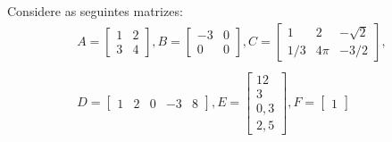 \documentclass{beamer}
\begin{document}
    \begin{frame}
      \begin{exemplos}
        Considere as seguintes matrizes:
        \begin{eqnarray*}
          A = \begin{bmatrix}
            1 & 2\\
            3 & 4
          \end{bmatrix},
          B = \begin{bmatrix}
            -3 & 0\\
            0 & 0
          \end{bmatrix},
          C = \begin{bmatrix}
            1 & 2 & -\sqrt{2}\\
            1/3 & 4\pi & -3/2
          \end{bmatrix},\\\\
          D = \begin{bmatrix}
            1 & 2 & 0 & -3 & 8
          \end{bmatrix},
          E = \begin{bmatrix}
            12\\
            3\\
            0,3\\
            2,5
          \end{bmatrix},
          F = \begin{bmatrix}
            1
          \end{bmatrix}
        \end{eqnarray*} 
      \end{exemplos}
    \end{frame}
\end{document}
